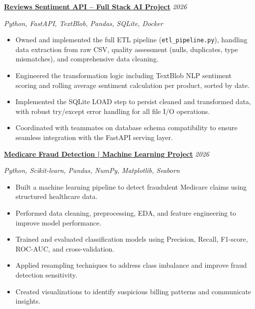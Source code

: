 \documentclass[a4paper,11pt]{article}
\newcommand{\cvproject}[2]{%
  \textbf{#1} \hfill \textit{#2}
  \vspace{2pt}
}
\begin{document}
\cvproject{\href{https://github.com/Seif-3mk-hassan/Sprints-capstone-project}{Reviews Sentiment API -- Full Stack AI Project}}{2026}
\newline \textit{Python, FastAPI, TextBlob, Pandas, SQLite, Docker} 
\begin{itemize}[leftmargin=1.5em, topsep=2pt, itemsep=-5pt]
  \item Owned and implemented the full ETL pipeline (\texttt{etl\_pipeline.py}), handling data extraction from raw CSV, quality assessment (nulls, duplicates, type mismatches), and comprehensive data cleaning.
  \item Engineered the transformation logic including TextBlob NLP sentiment scoring and rolling average sentiment calculation per product, sorted by date.
  \item Implemented the SQLite LOAD step to persist cleaned and transformed data, with robust try/except error handling for all file I/O operations.
  \item Coordinated with teammates on database schema compatibility to ensure seamless integration with the FastAPI serving layer.
\end{itemize}

\newpage

\cvproject{\href{https://github.com/Khaled100233/medicare-fraud-detection}{Medicare Fraud Detection | Machine Learning Project}}{2026}
\newline \textit{Python, Scikit-learn, Pandas, NumPy, Matplotlib, Seaborn}
\begin{itemize}[leftmargin=1.5em, topsep=2pt, itemsep=-5pt]
  \item Built a machine learning pipeline to detect fraudulent Medicare claims using structured healthcare data.
  \item Performed data cleaning, preprocessing, EDA, and feature engineering to improve model performance.
  \item Trained and evaluated classification models using Precision, Recall, F1-score, ROC-AUC, and cross-validation.
  \item Applied resampling techniques to address class imbalance and improve fraud detection sensitivity.
  \item Created visualizations to identify suspicious billing patterns and communicate insights.
\end{itemize}

\vspace{6pt}
\end{document}
